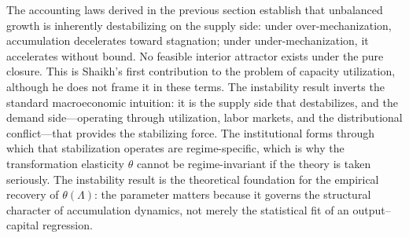 \documentclass[11pt,a4paper]{article}
\begin{document}
The accounting laws derived in the previous section establish that unbalanced growth is inherently destabilizing on the supply side: under over-mechanization, accumulation decelerates toward stagnation; under under-mechanization, it accelerates without bound. No feasible interior attractor exists under the pure closure. This is Shaikh's first contribution to the problem of capacity utilization, although he does not frame it in these terms. The instability result inverts the standard macroeconomic intuition: it is the supply side that destabilizes, and the demand side---operating through utilization, labor markets, and the distributional conflict---that provides the stabilizing force. The institutional forms through which that stabilization operates are regime-specific, which is why the transformation elasticity $\theta$ cannot be regime-invariant if the theory is taken seriously. The instability result is the theoretical foundation for the empirical recovery of $\theta(\Lambda)$: the parameter matters because it governs the structural character of accumulation dynamics, not merely the statistical fit of an output--capital regression.
\end{document}
